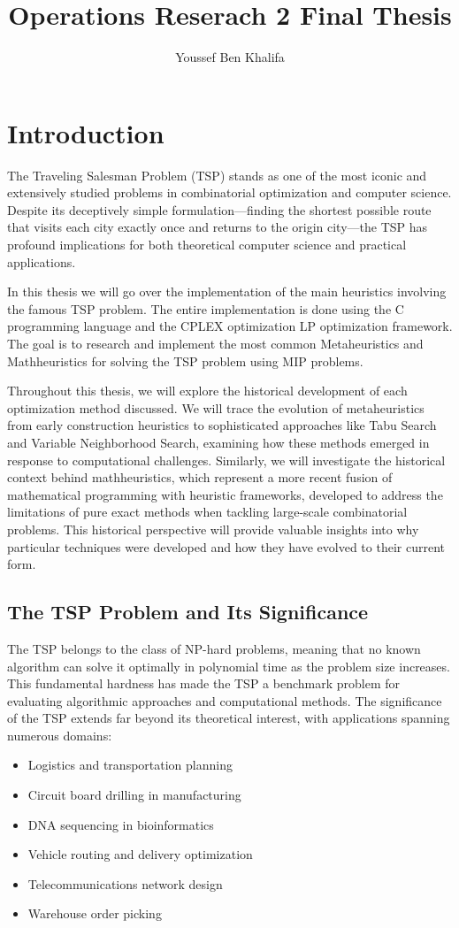 \documentclass{article}
\title{Operations Reserach 2 Final Thesis}
\author{Youssef Ben Khalifa}
\begin{document}
\maketitle

\section{Introduction}
The Traveling Salesman Problem (TSP) stands as one of the most iconic and extensively studied problems in combinatorial optimization and computer science. Despite its deceptively simple formulation—finding the shortest 
possible route that visits each city exactly once and returns to the origin city—the TSP has profound implications for both theoretical computer science and practical applications.

In this thesis we will go over the implementation of the main heuristics involving the famous TSP problem. The entire implementation is done using the C programming language and the 
CPLEX optimization LP optimization framework.
The goal is to research and implement the most common Metaheuristics and Mathheuristics for solving the TSP problem using MIP problems.

Throughout this thesis, we will explore the historical development of each optimization method discussed. We will trace the evolution of metaheuristics from early construction heuristics to 
sophisticated approaches like 
Tabu Search and Variable Neighborhood Search, examining how these methods emerged in response to computational challenges. 
Similarly, we will investigate the historical context behind mathheuristics, which represent a 
more recent fusion of mathematical programming with heuristic frameworks, developed to address the 
limitations of pure exact methods when tackling large-scale combinatorial problems. This historical perspective will 
provide valuable insights into why particular techniques were developed and how they have evolved to their current form.


\subsection{The TSP Problem and Its Significance}
The TSP belongs to the class of NP-hard problems, meaning that no known algorithm can solve it optimally in polynomial time as the problem size increases. 
This fundamental hardness has made the TSP a benchmark problem for evaluating algorithmic approaches and computational methods. The significance of the TSP extends far beyond its theoretical interest, with applications 
spanning numerous domains:
\begin{itemize}
	\item Logistics and transportation planning
	\item Circuit board drilling in manufacturing
	\item DNA sequencing in bioinformatics
	\item Vehicle routing and delivery optimization
	\item Telecommunications network design
	\item Warehouse order picking
\end{itemize}
\end{document}
